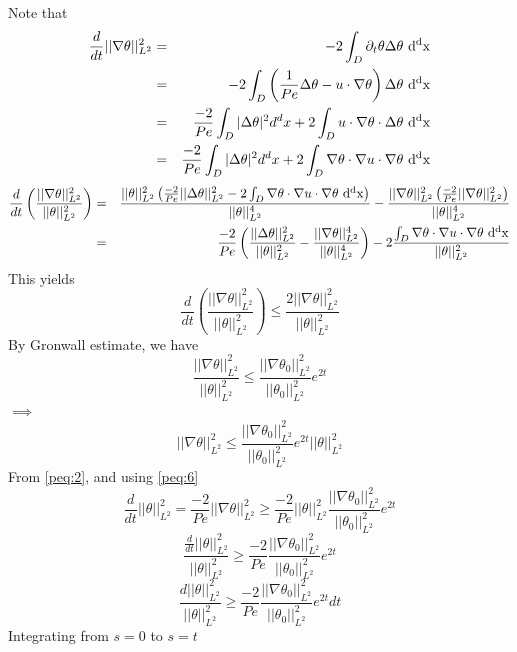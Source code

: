 \documentclass[12pt]{report}   %
\renewcommand{\leq}{\leqslant}
\renewcommand{\geq}{\geqslant}
\numberwithin{equation}{section}
\theoremstyle{plain}
\theoremstyle{definition}
\theoremstyle{remark}
\begin{document}
 Note that 
 \begin{eqnarray*}
 \frac{d}{dt}||\nabla\theta||_{L^2}^2 &=& -2\int_D \partial_t\theta\Delta\theta ~\rm{d}^dx \\
 & = & -2\int_D \left( \frac{1}{Pe}\Delta\theta - u\cdot\nabla\theta  \right) \Delta\theta ~\rm{d}^dx \\
 & = & \frac{-2}{Pe}\int_D |\Delta\theta|^2 d^dx + 2\int_D u\cdot\nabla\theta\cdot\Delta\theta ~\rm{d}^dx \\
 & = & \frac{-2}{Pe}\int_D |\Delta\theta|^2 d^dx + 2\int_D \nabla\theta\cdot \nabla u\cdot\nabla\theta ~\rm{d}^dx \\
 \end{eqnarray*}
 \begin{eqnarray*}
 \frac{d}{dt}\left( \frac{||\nabla\theta||_{L^2}^2}{||\theta||_{L^2}^2} \right)   & = & \frac{||\theta||_{L^2}^2 \left(\frac{-2}{Pe}||\Delta\theta||_{L^2}^2 -2\int_D\nabla\theta\cdot\nabla u\cdot\nabla\theta ~\rm{d}^dx \right) }{||\theta||_{L^2}^4} - \frac{||\nabla\theta||_{L^2}^2\left(\frac{-2}{Pe}||\nabla\theta||_{L^2}^2\right)    }{||\theta||_{L^2}^4}  \\
  & = & \frac{-2}{Pe}\left(\frac{||\Delta\theta||_{L^2}^2}{||\theta||_{L^2}^2} - \frac{||\nabla\theta||_{L^2}^4}{||\theta||_{L^2}^4} \right) -2\frac{\int_D\nabla\theta\cdot\nabla u\cdot\nabla\theta ~\rm{d}^dx}{||\theta||_{L^2}^2}  \\
  \end{eqnarray*}
 This yields
 \[\frac{d}{dt}\left( \frac{||\nabla\theta||_{L^2}^2}{||\theta||_{L^2}^2} \right) \leq \frac{2||\nabla\theta||_{L^2}^2}{||\theta||_{L^2}^2}\]
 By Gronwall estimate, we have
 \[  \frac{||\nabla\theta||_{L^2}^2}{||\theta||_{L^2}^2} \leq \frac{||\nabla\theta_0||_{L^2}^2}{||\theta_0||_{L^2}^2} e^{2t}\]
$\implies$
 \begin{equation} ||\nabla\theta||_{L^2}^2  \leq \frac{||\nabla\theta_0||_{L^2}^2}{||\theta_0||_{L^2}^2} e^{2t} ||\theta||_{L^2}^2 \label{peq:6}
 \end{equation}
 From \eqref{peq:2}, and using \eqref{peq:6}
 \[ \frac{d}{dt}||\theta||_{L^2}^2 = \frac{-2}{Pe}||\nabla\theta||_{L^2}^2 \geq \frac{-2}{Pe}||\theta||_{L^2}^2\frac{||\nabla\theta_0||_{L^2}^2}{||\theta_0||_{L^2}^2}e^{2t}\]
 \[\frac{\frac{d}{dt}||\theta||_{L^2}^2}{||\theta||_{L^2}^2} \geq \frac{-2}{Pe}\frac{||\nabla\theta_0||_{L^2}^2}{||\theta_0||_{L^2}^2}e^{2t} \]
  \[\frac{d||\theta||_{L^2}^2}{||\theta||_{L^2}^2} \geq \frac{-2}{Pe}\frac{||\nabla\theta_0||_{L^2}^2}{||\theta_0||_{L^2}^2}e^{2t}dt \]
  Integrating from $s=0$ to $s=t$ \\
\end{document}

